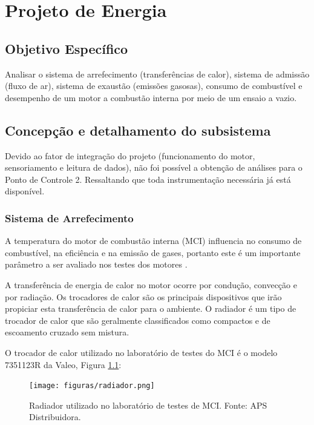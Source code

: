 \chapter[Projeto de Energia]{Projeto de Energia}

\section{Objetivo Específico}

Analisar o sistema de arrefecimento (transferências de calor), sistema de admissão (fluxo de ar), sistema de exaustão (emissões gasosas), consumo de combustível e desempenho de um motor a combustão interna por meio de um ensaio a vazio.

\section{Concepção e detalhamento do subsistema}

Devido ao fator de integração do projeto (funcionamento do motor, sensoriamento e leitura de dados), não foi possível a obtenção de análises para o Ponto de Controle 2. Ressaltando que toda instrumentação necessária já está disponível.

\subsection{Sistema de Arrefecimento}

A temperatura do motor de combustão interna (MCI) influencia no consumo de combustível, na eficiência e na emissão de gases, portanto este é um importante parâmetro a ser avaliado nos testes dos motores \cite{kuntzer15}.

A transferência de energia de calor no motor ocorre por condução, convecção e por radiação. Os trocadores de calor são os principais dispositivos que irão propiciar esta transferência de calor para o ambiente. O radiador é um tipo de trocador de calor que são geralmente classificados como compactos e de escoamento cruzado sem mistura.

O trocador de calor utilizado no laboratório de testes do MCI é o modelo 7351123R da Valeo, Figura \ref{radiador}:

\begin{figure}[h!]
	\centering
	\texttt{[image: figuras/radiador.png]}
	\caption{Radiador utilizado no laboratório de testes de MCI. Fonte: APS Distribuidora.}
	\label{radiador}
\end{figure}

